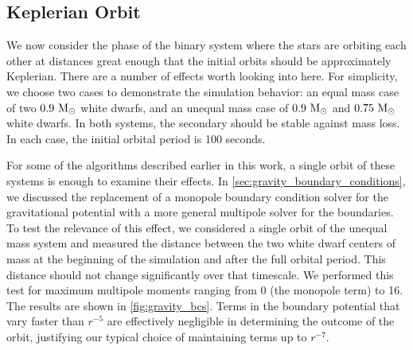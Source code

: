 \documentclass[12pt]{article}
\begin{document}
\subsection{Keplerian Orbit}
\label{sec:kepler}

We now consider the phase of the binary system where the stars are orbiting each other 
at distances great enough that the initial orbits should be approximately Keplerian. 
There are a number of effects worth looking into here. For simplicity, we choose two 
cases to demonstrate the simulation behavior: an equal mass case of two $0.9\ \mathrm{M}_\odot$ 
white dwarfs, and an unequal mass case of $0.9\ \mathrm{M}_\odot$ and $0.75\ \mathrm{M}_\odot$ white dwarfs.
In both systems, the secondary should be stable against mass loss.
In each case, the initial orbital period is 100 seconds.

For some of the algorithms described earlier in this work, a single orbit of these 
systems is enough to examine their effects. In \autoref{sec:gravity_boundary_conditions},
we discussed the replacement of a monopole boundary condition solver for the gravitational 
potential with a more general multipole solver for the boundaries. To test the relevance 
of this effect, we considered a single orbit of the unequal mass system and measured 
the distance between the two white dwarf centers of mass at the beginning of the simulation and after 
the full orbital period. This distance should not change significantly over that timescale.
We performed this test for maximum multipole moments ranging from 0 (the monopole term) to 16.
The results are shown in \autoref{fig:gravity_bcs}. Terms in the boundary potential 
that vary faster than $r^{-5}$ are effectively negligible in determining the outcome of the orbit, 
justifying our typical choice of maintaining terms up to $r^{-7}$.
\end{document}
